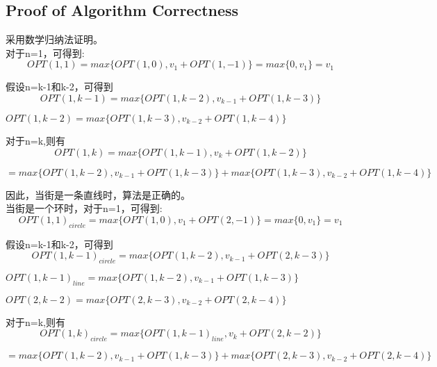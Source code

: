 \documentclass{article}
\begin{document}
\begin{CJK*}{UTF8}{gbsn}
\subsection{Proof of Algorithm Correctness}
采用数学归纳法证明。
\\

对于n=1，可得到:
\begin{equation}
OPT(1,1)=max\{OPT(1,0), v_1 + OPT(1,-1)\}=max\{0,v_1\}=v_1
\end{equation}

假设n=k-1和k-2，可得到
\begin{equation}
OPT(1,k-1)=max\{OPT(1,k-2), v_{k-1} + OPT(1, k-3)\}
\end{equation}

\begin{center}
$OPT(1,k-2)=max\{OPT(1,k-3), v_{k-2} + OPT(1, k-4)\}$
\end{center}

对于n=k,则有
\begin{equation}
OPT(1,k)=max\{OPT(1,k-1), v_{k} + OPT(1, k-2)\}
\end{equation}

\begin{center}
$=max\{OPT(1,k-2), v_{k-1} + OPT(1, k-3)\}+max\{OPT(1,k-3), v_{k-2} + OPT(1, k-4)\}$
\end{center}

因此，当街是一条直线时，算法是正确的。
\\

当街是一个环时，对于n=1，可得到:
\begin{equation}
OPT(1,1)_{circle}=max\{OPT(1,0), v_1 + OPT(2,-1)\}=max\{0,v_1\}=v_1
\end{equation}

假设n=k-1和k-2，可得到
\begin{equation}
OPT(1,k-1)_{circle}=max\{OPT(1,k-2), v_{k-1} + OPT(2, k-3)\}
\end{equation}
\begin{center}
$OPT(1,k-1)_{line}=max\{OPT(1,k-2), v_{k-1} + OPT(1, k-3)\}$
\end{center}
\begin{center}
$OPT(2,k-2)=max\{OPT(2,k-3), v_{k-2} + OPT(2, k-4)\}$
\end{center}

对于n=k,则有
\begin{equation}
OPT(1,k)_{circle}=max\{OPT(1,k-1)_{line}, v_{k} + OPT(2, k-2)\}
\end{equation}

\begin{center}
$=max\{OPT(1,k-2), v_{k-1} + OPT(1, k-3)\}+max\{OPT(2,k-3), v_{k-2} + OPT(2, k-4)\}$
\end{center}


\end{CJK*}
\end{document}
